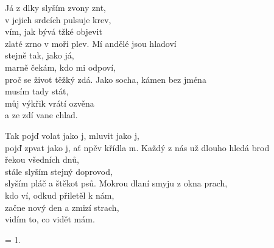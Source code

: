 \ve
Já z dlky slyším zvony znt,\\
v jejich srdcích pulsuje krev,\\
vím, jak bývá tžké objevit\\
zlaté zrno v moři plev.
\ve
Mí andělé jsou hladoví\\
stejně tak, jako já,\\
marně čekám, kdo mi odpoví,\\
proč se život těžký zdá.
\ve
Jako socha, kámen bez jména\\
musím tady stát,\\
můj výkřik vrátí ozvěna\\
a ze zdí vane chlad.

\cho
Tak pojď volat jako j, mluvit jako j,\\
pojď zpvat jako j, ať npěv křídla m.
\ve
Každý z nás už dlouho hledá brod\\
řekou všedních dnů,\\
stále slyším stejný doprovod,\\
slyším pláč a štěkot psů.
\ve
Mokrou dlaní smyju z okna prach,\\
kdo ví, odkud přiletěl k nám,\\
začne nový den a zmizí strach,\\
vidím to, co vidět mám.


\ve =  1.
\esong

